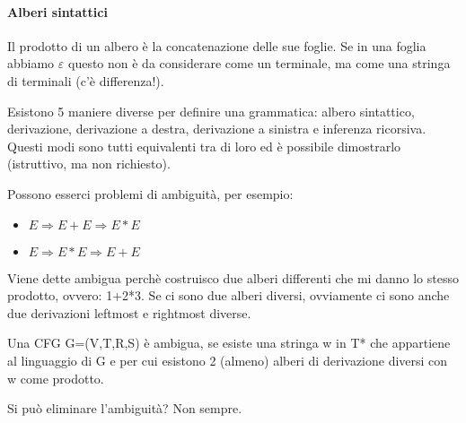 \paragraph{Alberi sintattici}
Il prodotto di un albero è la concatenazione delle sue foglie. Se in una foglia
abbiamo $\varepsilon$ questo non è da considerare come un terminale, ma come
una stringa di terminali (c'è differenza!).

Esistono 5 maniere diverse per definire una grammatica: albero sintattico, 
derivazione, derivazione a destra, derivazione a sinistra e inferenza ricorsiva.
Questi modi sono tutti equivalenti tra di loro ed è possibile dimostrarlo 
(istruttivo, ma non richiesto).

Possono esserci problemi di ambiguità, per esempio:
\begin{itemize}
\item $E\Rightarrow E+E\Rightarrow E*E$
\item $E\Rightarrow E*E\Rightarrow E+E$
\end{itemize}
Viene dette ambigua perchè costruisco due alberi differenti che mi danno lo 
stesso prodotto, ovvero: 1+2*3.
Se ci sono due alberi diversi, ovviamente ci sono anche due derivazioni leftmost e
rightmost diverse.

Una CFG G=(V,T,R,S) è ambigua, se esiste una stringa w in T* che appartiene al 
linguaggio di G e per cui esistono 2 (almeno) alberi di derivazione diversi con w 
come prodotto.

Si può eliminare l'ambiguità? Non sempre.























